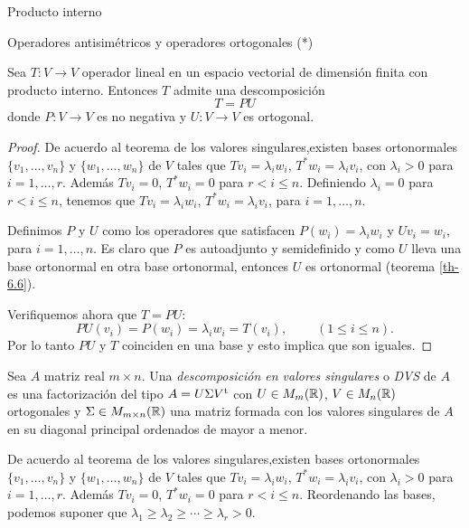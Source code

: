 \begin{chapter}{Producto interno}
\begin{section}{Operadores antisim\'etricos y operadores ortogonales (*)}
        \begin{teorema} Sea $T: V \to V$ operador lineal en un espacio vectorial de dimensión finita con producto interno. Entonces $T$  admite una descomposición
            $$
            T = PU
            $$
            donde $P:V \to V$ es no negativa y $U: V \to V$  es ortogonal.
        \end{teorema}
        \begin{proof}
        De acuerdo al teorema de los valores singulares,existen bases ortonormales $\{v_1,\ldots,v_n\}$ y $\{w_1,\ldots,w_n\}$  de $V$ tales que $Tv_i = \lambda_i w_i$,  $T^*w_i = \lambda_i v_i$, con $\lambda_i >0$ para $i=1,\ldots,r$. Además $Tv_i = 0$,  $T^*w_i = 0$ para $r < i \le n$. Definiendo $\lambda_i =0$ para $r < i \le n$,  tenemos que $Tv_i = \lambda_i w_i$,  $T^*w_i = \lambda_i v_i$, para $i=1,\ldots,n$.
        
        Definimos $P$ y $U$ como los operadores que satisfacen $P(w_i) = \lambda_i w_i$ y $Uv_i = w_i$, para $i=1,\ldots,n$. Es claro que $P$ es autoadjunto y semidefinido y como $U$ lleva una base ortonormal en otra base ortonormal,  entonces $U$  es ortonormal (teorema \ref{th-6.6}).
        
        Verifiquemos ahora que $T =PU$: 
        $$
        PU(v_i) = P(w_i) = \lambda_i w_i = T(v_i), \;\qquad(1 \le i \le n).
        $$ 
        Por lo tanto  $PU$ y $T$ coinciden en una base y esto implica que son iguales.
         
        \end{proof}
        
        
        Sea $A$ matriz real $m \times n$. Una \textit{descomposición en valores singulares} o \textit{DVS} de $A$ es una factorización del tipo $A = U \Sigma V^{{\operatorname{t}}}$ con $U \in M_{m}(\mathbb R)$, $V \in M_{n}(\mathbb R)$ ortogonales y $\Sigma \in M_{m \times n}(\mathbb R)$ una matriz formada con los valores singulares de $A$ en su diagonal principal ordenados de mayor a menor.
        
        De acuerdo al teorema de los valores singulares,existen bases ortonormales $\{v_1,\ldots,v_n\}$ y $\{w_1,\ldots,w_n\}$  de $V$ tales que $Tv_i = \lambda_i w_i$,  $T^*w_i = \lambda_i v_i$, con $\lambda_i >0$ para $i=1,\ldots,r$. Además $Tv_i = 0$,  $T^*w_i = 0$ para $r < i \le n$. Reordenando las bases, podemos suponer que $\lambda_1 \ge \lambda_{2} \ge \cdots \ge \lambda_{r}>0$. 
        

\end{section}
\end{chapter}
